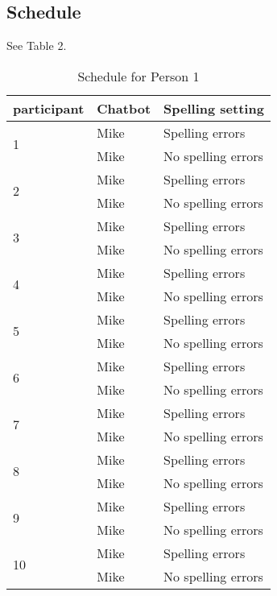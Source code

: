 \subsection{Schedule}
See Table 2.
\begin{table}[!ht]
   \begin{center}
      \caption{Schedule for Person 1}
      \label{tabscheduleperson1}
      \vskip 0.12in
      \begin{tabular}[center]{| l | l | l |}
         \hline
         participant & Chatbot & Spelling setting \\
         \hline \hline
         \multirow{2}{*}{1}& Mike & Spelling errors \\
                           & Mike & No spelling errors \\
         \hline
         \multirow{2}{*}{2}& Mike & Spelling errors \\
                           & Mike & No spelling errors \\
         \hline
         \multirow{2}{*}{3}& Mike & Spelling errors \\
                           & Mike & No spelling errors \\
         \hline
         \multirow{2}{*}{4}& Mike & Spelling errors \\
                           & Mike & No spelling errors \\
         \hline
         \multirow{2}{*}{5}& Mike & Spelling errors \\
                           & Mike & No spelling errors \\
         \hline
         \multirow{2}{*}{6}& Mike & Spelling errors \\
                           & Mike & No spelling errors \\
         \hline
         \multirow{2}{*}{7}& Mike & Spelling errors \\
                           & Mike & No spelling errors \\
         \hline
         \multirow{2}{*}{8}& Mike & Spelling errors \\
                           & Mike & No spelling errors \\
         \hline
         \multirow{2}{*}{9}& Mike & Spelling errors \\
                           & Mike & No spelling errors \\
         \hline
         \multirow{2}{*}{10} & Mike & Spelling errors \\
                             & Mike & No spelling errors \\

\end{tabular}
\end{center}
\end{table}
